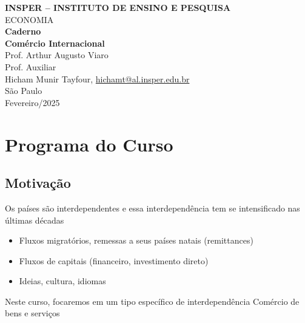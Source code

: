 \documentclass[a4paper,12pt]{article}[abntex2]
\begin{document}
\begin{titlepage}
    \centering
    \vspace*{1cm}
    \Large\textbf{INSPER – INSTITUTO DE ENSINO E PESQUISA}\\
    \Large ECONOMIA\\
    \vspace{1.5cm}
    \Large\textbf{Caderno}\\
    \textbf{Comércio Internacional}\\
    \vspace{1.5cm}
    Prof. Arthur Augusto Viaro\\
    Prof. Auxiliar  \\
    \vfill
    \normalsize
    Hicham Munir Tayfour, \href{mailto:hichamt@al.insper.edu.br}{hichamt@al.insper.edu.br}\\

    \vfill
    São Paulo\\
    Fevereiro/2025
\end{titlepage}

\newpage
\tableofcontents
\thispagestyle{empty} %

\newpage 
\listoffigures
\thispagestyle{empty} %

\newpage
\setcounter{page}{1} %
\justify
\onehalfspacing


\section*{\textbf{Programa do Curso}}
\subsection*{\textbf{Motivação}}
Os países são interdependentes e essa interdependência tem se intensificado nas últimas décadas\begin{itemize}
    \item Fluxos migratórios, remessas a seus países natais (remittances)
    \item Fluxos de capitais (financeiro, investimento direto)
    \item Ideias, cultura, idiomas
\end{itemize}

Neste curso, focaremos em um tipo específico de interdependência Comércio de bens e serviços
\end{document}
